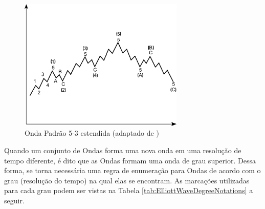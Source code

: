 \documentclass[12pt]{article}
\begin{document}
\begin{figure}[H]
	\centering
	\includegraphics[width=0.7\textwidth]{ElliottWave5-3_extended.png}
	\caption{Onda Padrão 5-3 estendida (adaptado de \cite{Masur})}\label{fig:ElliottWave5-3_extended}
\end{figure}

Quando um conjunto de Ondas forma uma nova onda em uma resolução de tempo diferente, é dito que
as Ondas formam uma onda de grau superior. Dessa forma, se torna necessária uma regra de
enumeração para Ondas de acordo com o grau (resolução do tempo) na qual elas se encontram.
As marcações utilizadas para cada grau podem ser vistas na
Tabela \ref{tab:ElliottWaveDegreeNotations} a seguir.
\end{document}
